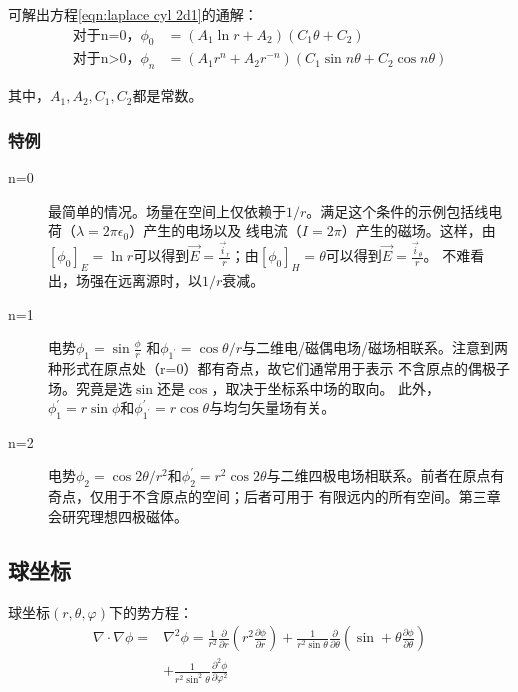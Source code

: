 可解出方程\ref{eqn:laplace cyl 2d1}的通解：
\begin{subequations}\label{eqn:laplace cyl 2d3}
	\begin{align}
\mbox{对于n=0，}\phi_{0} &= (A_1 \ln r+A_2)(C_1 \theta+C_2) \\
\mbox{对于n>0，} \phi_{n} &= (A_1 r^n+A_2 r^{-n})(C_1 \sin n\theta +C_2 \cos n\theta)
	\end{align}
\end{subequations}

其中，$A_1, A_2, C_1, C_2$都是常数。

\subsubsection{特例}
\begin{description}
  \item[n=0] 最简单的情况。场量在空间上仅依赖于$1/r$。满足这个条件的示例包括线电荷（$\lambda=2\pi \epsilon_0$）产生的电场以及
  线电流（$I=2\pi$）产生的磁场。这样，由$[\phi_0]_E=\ln r$可以得到$\vec{E}=\frac{\vec{i}_r}{r} $；由$[\phi_0]_H=\theta$可以得到$\vec{E}=\frac{\vec{i}_{\theta}}{r} $。
  不难看出，场强在远离源时，以$1/r$衰减。
\item[n=1] 电势$\phi_1=\sin \frac{\phi}{r}$ 和$\phi_{1^\prime}=\cos \theta/r$与二维电/磁偶电场/磁场相联系。注意到两种形式在原点处（r=0）都有奇点，故它们通常用于表示
不含原点的偶极子场。究竟是选$\sin$还是$\cos$，取决于坐标系中场的取向。
此外，$\phi_1^\prime=r \sin \phi$和$\phi_{1^\prime}^\prime=r \cos \theta$与均匀矢量场有关。
 \item[n=2] 电势$\phi_2=\cos 2\theta/r^2$和$\phi_2^\prime= r^2 \cos 2\theta$与二维四极电场相联系。前者在原点有奇点，仅用于不含原点的空间；后者可用于
 有限远内的所有空间。第三章会研究理想四极磁体。
\end{description}

\subsection{球坐标}
球坐标$(r, \theta, \varphi)$下的势方程：
\begin{equation}\label{eqn:laplace sph1}
\begin{split}
  \nabla\cdot\nabla\phi=&\nabla^2\phi=\frac{1}{r^2}\frac{\partial}{\partial r}(r^2\frac{\partial \phi}{\partial r})
  +\frac{1}{r^2\sin \theta}\frac{\partial}{\partial \theta}(\sin +\theta\frac{\partial \phi}{\partial \theta})\\
  &+\frac{1}{r^2\sin^2 \theta}\frac{\partial^2 \phi}{\partial \varphi^2}
\end{split}
\end{equation}

